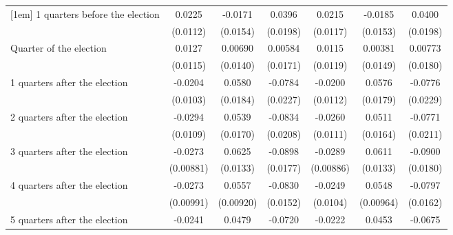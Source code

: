 \begin{table}[htbp]
\begin{tabular}{l*{6}{c}}
[1em]
 1 quarters before the election&      0.0225\sym{*}  &     -0.0171         &      0.0396\sym{*}  &      0.0215         &     -0.0185         &      0.0400\sym{*}  \\
                    &    (0.0112)         &    (0.0154)         &    (0.0198)         &    (0.0117)         &    (0.0153)         &    (0.0198)         \\
[1em]
Quarter of the election&      0.0127         &     0.00690         &     0.00584         &      0.0115         &     0.00381         &     0.00773         \\
                    &    (0.0115)         &    (0.0140)         &    (0.0171)         &    (0.0119)         &    (0.0149)         &    (0.0180)         \\
[1em]
 1 quarters after the election&     -0.0204\sym{*}  &      0.0580\sym{**} &     -0.0784\sym{***}&     -0.0200         &      0.0576\sym{**} &     -0.0776\sym{***}\\
                    &    (0.0103)         &    (0.0184)         &    (0.0227)         &    (0.0112)         &    (0.0179)         &    (0.0229)         \\
[1em]
 2 quarters after the election&     -0.0294\sym{**} &      0.0539\sym{**} &     -0.0834\sym{***}&     -0.0260\sym{*}  &      0.0511\sym{**} &     -0.0771\sym{***}\\
                    &    (0.0109)         &    (0.0170)         &    (0.0208)         &    (0.0111)         &    (0.0164)         &    (0.0211)         \\
[1em]
 3 quarters after the election&     -0.0273\sym{**} &      0.0625\sym{***}&     -0.0898\sym{***}&     -0.0289\sym{**} &      0.0611\sym{***}&     -0.0900\sym{***}\\
                    &   (0.00881)         &    (0.0133)         &    (0.0177)         &   (0.00886)         &    (0.0133)         &    (0.0180)         \\
[1em]
 4 quarters after the election&     -0.0273\sym{**} &      0.0557\sym{***}&     -0.0830\sym{***}&     -0.0249\sym{*}  &      0.0548\sym{***}&     -0.0797\sym{***}\\
                    &   (0.00991)         &   (0.00920)         &    (0.0152)         &    (0.0104)         &   (0.00964)         &    (0.0162)         \\
[1em]
 5 quarters after the election&     -0.0241\sym{*}  &      0.0479\sym{**} &     -0.0720\sym{***}&     -0.0222\sym{*}  &      0.0453\sym{**} &     -0.0675\sym{***}\\

\end{tabular}
\end{table}
